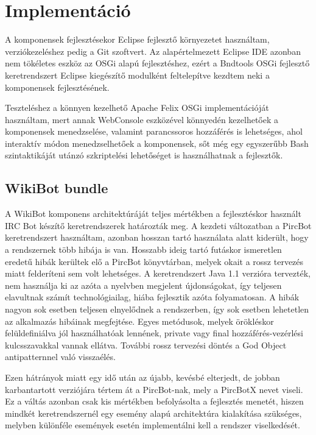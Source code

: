 \chapter{Implementáció}
\label{cha:implementation}

A komponensek fejlesztésekor Eclipse fejlesztő környezetet használtam, verziókezeléshez pedig a Git szoftvert. Az alapértelmezett Eclipse IDE azonban nem tökéletes eszköz az OSGi alapú fejlesztéshez, ezért a Bndtools \cite{bndtools} OSGi fejlesztő keretrendszert Eclipse kiegészítő modulként feltelepítve kezdtem neki a komponensek fejlesztésének.

Teszteléshez a könnyen kezelhető Apache Felix \cite{apachefelix} OSGi implementációját használtam, mert annak WebConsole eszközével könnyedén kezelhetőek a komponensek menedzselése, valamint parancssoros hozzáférés is lehetséges, ahol interaktív módon menedzselhetőek a komponensek, sőt még egy egyszerűbb Bash szintaktikáját utánzó szkriptelési lehetőséget is használhatnak a fejlesztők.

\section{WikiBot bundle}
\label{sec:wikibotbundle}

A WikiBot komponens architektúráját teljes mértékben a fejlesztéskor használt IRC Bot készítő keretrendszerek határozták meg. A kezdeti változatban a PircBot \cite{pircbot} keretrendszert használtam, azonban hosszan tartó használata alatt kiderült, hogy a rendszernek több hibája is van. Hosszabb ideig tartó futáskor ismeretlen eredetű hibák kerültek elő a PircBot könyvtárban, melyek okait a rossz tervezés miatt felderíteni sem volt lehetséges. A keretrendszert Java 1.1 verzióra tervezték, nem használja ki az azóta a nyelvben megjelent újdonságokat, így teljesen elavultnak számít technológiailag, hiába fejlesztik azóta folyamatosan. A hibák nagyon sok esetben teljesen elnyelődnek a rendszerben, így sok esetben lehetetlen az alkalmazás hibáinak megfejtése. Egyes metódusok, melyek örökléskor felüldefiniálva jól használhatóak lennének, private vagy final hozzáférés-vezérlési kulcsszavakkal vannak ellátva. További rossz tervezési döntés a God Object antipatternnel való visszaélés.

Ezen hátrányok miatt egy idő után az újabb, kevésbé elterjedt, de jobban karbantartott verziójára tértem át a PircBot-nak, mely a PircBotX \cite{pircbotx} nevet viseli. Ez a váltás azonban csak kis mértékben befolyásolta a fejlesztés menetét, hiszen mindkét keretrendszernél egy esemény alapú architektúra kialakítása szükséges, melyben különféle események esetén implementálni kell a rendszer viselkedését.

